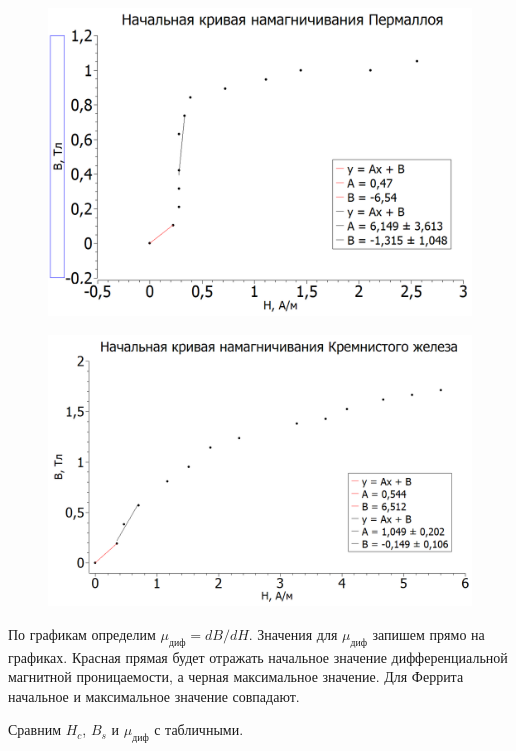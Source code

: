 \documentclass[a4paper, 12pt]{article}%
\begin{document}
\begin{figure}[h!]
\centering
\includegraphics[scale=0.5]{Пермаллой.png}
\label{fig:Image1}
\end{figure}

\begin{figure}[h!]
\centering
\includegraphics[scale=0.5]{Кремнистое_железо.png}
\label{fig:Image1}
\end{figure}

По графикам определим $\mu_{\text{диф}} = dB/dH$. Значения для $\mu_{\text{диф}}$ запишем прямо на графиках. Красная прямая будет отражать начальное значение дифференциальной магнитной проницаемости, а черная максимальное значение. Для Феррита начальное и максимальное значение совпадают.

Сравним $H_c$, $B_s$ и $\mu_{\text{диф}}$ с табличными.
\end{document}
